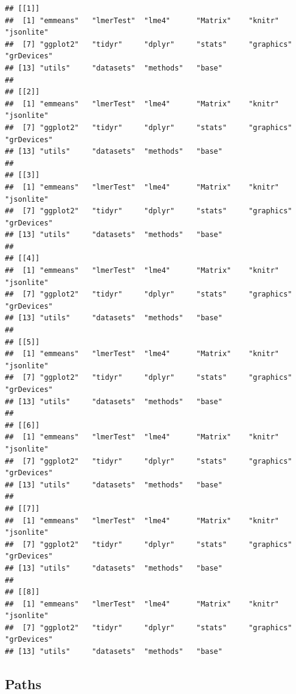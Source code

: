 \documentclass[
]{article}
\begin{document}
\begin{verbatim}
## [[1]]
##  [1] "emmeans"   "lmerTest"  "lme4"      "Matrix"    "knitr"     "jsonlite" 
##  [7] "ggplot2"   "tidyr"     "dplyr"     "stats"     "graphics"  "grDevices"
## [13] "utils"     "datasets"  "methods"   "base"     
## 
## [[2]]
##  [1] "emmeans"   "lmerTest"  "lme4"      "Matrix"    "knitr"     "jsonlite" 
##  [7] "ggplot2"   "tidyr"     "dplyr"     "stats"     "graphics"  "grDevices"
## [13] "utils"     "datasets"  "methods"   "base"     
## 
## [[3]]
##  [1] "emmeans"   "lmerTest"  "lme4"      "Matrix"    "knitr"     "jsonlite" 
##  [7] "ggplot2"   "tidyr"     "dplyr"     "stats"     "graphics"  "grDevices"
## [13] "utils"     "datasets"  "methods"   "base"     
## 
## [[4]]
##  [1] "emmeans"   "lmerTest"  "lme4"      "Matrix"    "knitr"     "jsonlite" 
##  [7] "ggplot2"   "tidyr"     "dplyr"     "stats"     "graphics"  "grDevices"
## [13] "utils"     "datasets"  "methods"   "base"     
## 
## [[5]]
##  [1] "emmeans"   "lmerTest"  "lme4"      "Matrix"    "knitr"     "jsonlite" 
##  [7] "ggplot2"   "tidyr"     "dplyr"     "stats"     "graphics"  "grDevices"
## [13] "utils"     "datasets"  "methods"   "base"     
## 
## [[6]]
##  [1] "emmeans"   "lmerTest"  "lme4"      "Matrix"    "knitr"     "jsonlite" 
##  [7] "ggplot2"   "tidyr"     "dplyr"     "stats"     "graphics"  "grDevices"
## [13] "utils"     "datasets"  "methods"   "base"     
## 
## [[7]]
##  [1] "emmeans"   "lmerTest"  "lme4"      "Matrix"    "knitr"     "jsonlite" 
##  [7] "ggplot2"   "tidyr"     "dplyr"     "stats"     "graphics"  "grDevices"
## [13] "utils"     "datasets"  "methods"   "base"     
## 
## [[8]]
##  [1] "emmeans"   "lmerTest"  "lme4"      "Matrix"    "knitr"     "jsonlite" 
##  [7] "ggplot2"   "tidyr"     "dplyr"     "stats"     "graphics"  "grDevices"
## [13] "utils"     "datasets"  "methods"   "base"
\end{verbatim}

\subsection{Paths}\label{paths}
\end{document}

